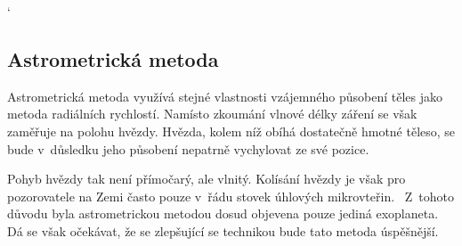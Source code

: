 \documentclass[a4paper,12pt]{article}
\begin{document}
{{\clearpage

{ %
\catcode`


\vspace{-10pt}

\subsection{Astrometrická metoda}


Astrometrická metoda využívá stejné vlastnosti vzájemného působení těles jako metoda radiálních rychlostí. Namísto zkoumání vlnové délky záření se však zaměřuje na polohu hvězdy. Hvězda, kolem níž obíhá dostatečně hmotné těleso, se bude v~důsledku jeho působení nepatrně vychylovat ze své pozice.~\cite{methods}

Pohyb hvězdy tak není přímočarý, ale vlnitý. Kolísání hvězdy je však pro pozorovatele na Zemi často pouze v~řádu stovek úhlových mikrovteřin.~\cite{methods} Z~tohoto důvodu byla astrometrickou metodou dosud objevena pouze jediná exoplaneta. Dá se však očekávat, že se zlepšující se technikou bude tato metoda úspěšnější.~\cite{nasadata}

}}}
\end{document}
